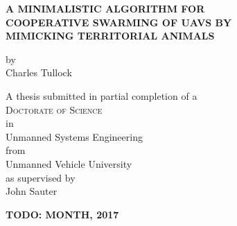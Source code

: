 
\begin{titlepage}
	\begin{center}

		\vspace*{1cm}
		 
		\large{ \textbf{ \uppercase{A minimalistic algorithm for\\cooperative swarming of UAVs by\\mimicking territorial animals}}}
		
		
		\vspace{1.5cm}
		
		by\\
		Charles Tullock\\
		
		\vspace{1.5cm}
		
		A thesis submitted in partial completion of a\\
		\large{\textsc{Doctorate of Science}}\\ 
		in\\
		\large{Unmanned Systems Engineering}\\
		from\\
		\large{Unmanned Vehicle University}\\
		as supervised by\\
		\large{John Sauter}
		
		\vspace{2cm}
		\textbf{TODO: MONTH, 2017}
		
		\vfill

	\end{center}
\thispagestyle{empty}
\end{titlepage}

